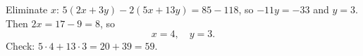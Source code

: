 Eliminate $x$: $5(2x+3y)-2(5x+13y)=85-118$, so $-11y=-33$ and $y=3$. Then $2x=17-9=8$, so
\[
\boxed{x=4,\quad y=3}.
\]
Check: $5\cdot4+13\cdot3=20+39=59$.
